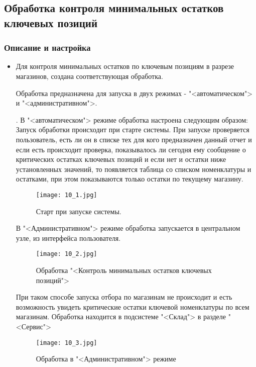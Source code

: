 \subsection{Обработка контроля минимальных остатков ключевых позиций}
\subsubsection{Описание и настройка}
\begin{itemize}	
	\item Для контроля минимальных остатков по ключевым позициям в разрезе магазинов, создана соответствующая обработка.\par
	Обработка предназначена для запуска в двух режимах - "<автоматическом"> и "<административном">.	\par
			.
	В "<автоматическом"> режиме обработка настроена следующим образом: Запуск обработки происходит при старте системы. При запуске проверяется пользователь, есть ли он в списке тех для кого предназначен данный отчет и если есть происходит проверка, показывалось ли сегодня ему сообщение о критических остатках ключевых позиций и если нет и остатки ниже установленных значений, то появляется таблица со списком номенклатуры и остатками, при этом показываются только остатки по текущему магазину.	\par
	\begin{figure}[H]
		\texttt{[image: 10\_1.jpg]}
		\caption{Старт при запуске системы.}
		\label{ris:10_1.jpg}
	\end{figure}
	В "<Административном">  режиме обработка  запускается в центральном узле, из интерфейса пользователя.
	\begin{figure}[H]
		\texttt{[image: 10\_2.jpg]}
		\caption{Обработка "<Контроль минимальных остатков ключевых позиций">}
		\label{ris:10_2.jpg}
	\end{figure}
	 При таком способе запуска отбора по магазинам не происходит и есть возможность увидеть критические остатки ключевой номенклатуры по всем магазинам. Обработка находится в подсистеме "<Склад"> в разделе "<Сервис">
	\begin{figure}[H]
		\texttt{[image: 10\_3.jpg]}
		\caption{Обработка в "<Административном"> режиме}
		\label{ris:10_3.jpg}
	\end{figure}


\end{itemize}

